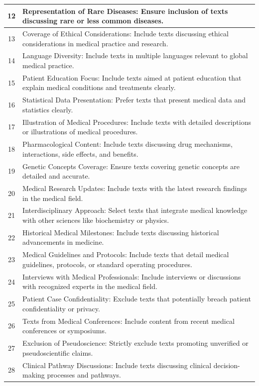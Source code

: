 \documentclass{article}
\begin{document}
\begin{longtable}{c|p{14cm}}
12 & Representation of Rare Diseases: Ensure inclusion of texts discussing rare or less common diseases. \\
\hline
13 & Coverage of Ethical Considerations: Include texts discussing ethical considerations in medical practice and research. \\
\hline
14 & Language Diversity: Include texts in multiple languages relevant to global medical practice. \\
\hline
15 & Patient Education Focus: Include texts aimed at patient education that explain medical conditions and treatments clearly. \\
\hline
16 & Statistical Data Presentation: Prefer texts that present medical data and statistics clearly. \\
\hline
17 & Illustration of Medical Procedures: Include texts with detailed descriptions or illustrations of medical procedures. \\
\hline
18 & Pharmacological Content: Include texts discussing drug mechanisms, interactions, side effects, and benefits. \\
\hline
19 & Genetic Concepts Coverage: Ensure texts covering genetic concepts are detailed and accurate. \\
\hline
20 & Medical Research Updates: Include texts with the latest research findings in the medical field. \\
\hline
21 & Interdisciplinary Approach: Select texts that integrate medical knowledge with other sciences like biochemistry or physics. \\
\hline
22 & Historical Medical Milestones: Include texts discussing historical advancements in medicine. \\
\hline
23 & Medical Guidelines and Protocols: Include texts that detail medical guidelines, protocols, or standard operating procedures. \\
\hline
24 & Interviews with Medical Professionals: Include interviews or discussions with recognized experts in the medical field. \\
\hline
25 & Patient Case Confidentiality: Exclude texts that potentially breach patient confidentiality or privacy. \\
\hline
26 & Texts from Medical Conferences: Include content from recent medical conferences or symposiums. \\
\hline
27 & Exclusion of Pseudoscience: Strictly exclude texts promoting unverified or pseudoscientific claims. \\
\hline
28 & Clinical Pathway Discussions: Include texts discussing clinical decision-making processes and pathways. \\

\end{longtable}
\end{document}
